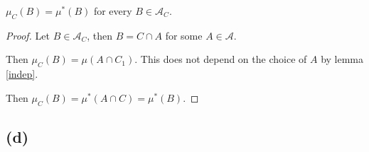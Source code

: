 \documentclass{unswmaths}
\begin{document}
\begin{theorem}
    $\mu_C(B) = \mu^*(B)$ for every $B \in \mathcal{A}_C$.
\end{theorem}
\begin{proof}
    Let $B \in \mathcal{A}_C$, then $B = C\cap A$ for some $A \in \mathcal{A}$.
    
    Then $\mu_C(B) = \mu(A\cap C_1)$. This does not depend on the choice
    of $A$ by lemma \ref{indep}.
    
    Then $\mu_C(B) = \mu^*(A\cap C) = \mu^*(B)$.
    
    
    
\end{proof}

\subsection*{(d)}
\end{document}
